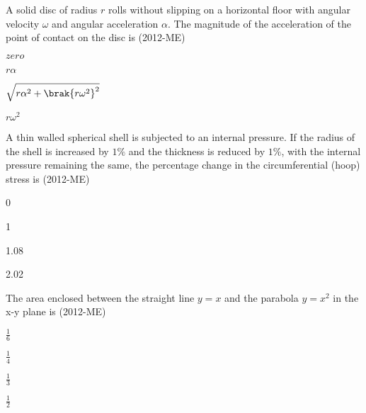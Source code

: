 \item A solid disc of radius $r$ rolls without slipping on a horizontal floor with angular velocity $\omega$ and
angular acceleration $\alpha$. The magnitude of the acceleration of the point of contact on the disc is \hfill{(2012-ME)} 
                 \begin{enumerate}   
                     \begin{multicols}{4}    
\item $zero$
\item $r\alpha$
\item $\sqrt{ {r\alpha}^{2}+{ \brak{ r  \omega^{2}  }  }  ^{2}  }  $
\item $r{\omega}^2$
		     \end{multicols}                            
                         \end{enumerate}



\item A thin walled spherical shell is subjected to an internal pressure. If the radius of the shell is increased by $1\%$ and the thickness is reduced by $1\%$, with the internal pressure remaining the same, the percentage change in the circumferential (hoop) stress is \hfill{(2012-ME)} 
  \begin{enumerate} 
\begin{multicols}{4}            
   \item 0
  \item 1
 \item 1.08
   \item 2.02
\end{multicols}       
  \end{enumerate}


\item The area enclosed between the straight line $y = x$ and the parabola $y = x^{2}$ in the x-y plane is \hfill{(2012-ME)} 
                 \begin{enumerate}   
                     \begin{multicols}{4}           

\item $\frac{1}{6}$
\item $\frac{1}{4}$
\item $\frac{1}{3}$
\item $\frac{1}{2}$
		     \end{multicols}                            
                         \end{enumerate}



